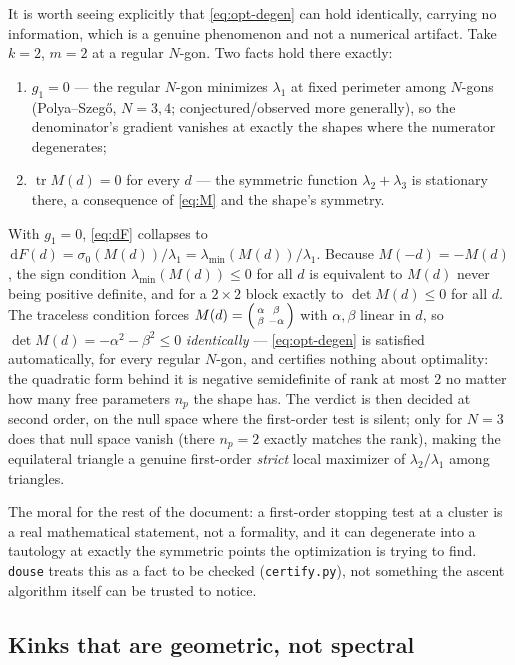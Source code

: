 \documentclass[11pt]{article}
\newcommand{\dd}{\,\mathrm{d}}
\newcommand{\code}[1]{\texttt{#1}}
\newcommand{\lammin}{\lambda_{\min}}
\theoremstyle{plain}
\begin{document}
It is worth seeing explicitly that \eqref{eq:opt-degen} can hold identically, carrying no
information, which is a genuine phenomenon and not a numerical artifact. Take $k=2$, $m=2$ at a
regular $N$-gon. Two facts hold there exactly:
\begin{enumerate}
\item $g_1=0$ --- the regular $N$-gon minimizes $\lambda_1$ at fixed perimeter among $N$-gons
  (Polya--Szeg\H{o}, $N=3,4$; conjectured/observed more generally), so the denominator's gradient
  vanishes at exactly the shapes where the numerator degenerates;
\item $\operatorname{tr}M(d)=0$ for every $d$ --- the symmetric function $\lambda_2+\lambda_3$ is
  stationary there, a consequence of \eqref{eq:M} and the shape's symmetry.
\end{enumerate}
With $g_1=0$, \eqref{eq:dF} collapses to $\dd F(d)=\sigma_0(M(d))/\lambda_1=\lammin(M(d))/\lambda_1$.
Because $M(-d)=-M(d)$, the sign condition $\lammin(M(d))\le0$ for all $d$ is equivalent to $M(d)$
never being positive definite, and for a $2\times2$ block exactly to $\det M(d)\le0$ for all $d$.
The traceless condition forces $M(d)=\begin{psmallmatrix}\alpha&\beta\\\beta&-\alpha\end{psmallmatrix}$
with $\alpha,\beta$ linear in $d$, so $\det M(d)=-\alpha^2-\beta^2\le0$ \emph{identically} ---
\eqref{eq:opt-degen} is satisfied automatically, for every regular $N$-gon, and certifies nothing
about optimality: the quadratic form behind it is negative semidefinite of rank at most $2$ no
matter how many free parameters $n_p$ the shape has. The verdict is then decided at second order,
on the null space where the first-order test is silent; only for $N=3$ does that null space vanish
(there $n_p=2$ exactly matches the rank), making the equilateral triangle a genuine first-order
\emph{strict} local maximizer of $\lambda_2/\lambda_1$ among triangles.

The moral for the rest of the document: a first-order stopping test at a cluster is a real
mathematical statement, not a formality, and it can degenerate into a tautology at exactly the
symmetric points the optimization is trying to find. \code{douse} treats this as a fact to be
checked (\code{certify.py}), not something the ascent algorithm itself can be trusted to notice.

\subsection{Kinks that are geometric, not spectral}\label{sec:kink}
\end{document}
